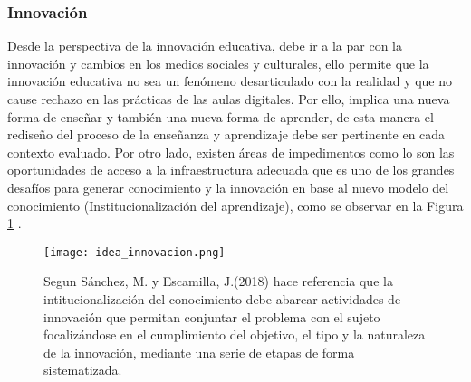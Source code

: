 \documentclass{article}
\begin{document}
\subsubsection{Innovación}
Desde la perspectiva de la innovación educativa, debe ir a la par con la innovación y cambios en los medios sociales y culturales, ello permite que la innovación educativa no sea un fenómeno desarticulado con la realidad y que no cause rechazo en las prácticas de las aulas digitales. Por ello, implica una nueva forma de enseñar y también una nueva forma de aprender, de esta manera el rediseño del proceso de la enseñanza y aprendizaje debe ser pertinente en cada contexto evaluado. Por otro lado, existen áreas de impedimentos como lo son las oportunidades de acceso a la infraestructura adecuada que es uno de los grandes desafíos para generar conocimiento y la innovación en base al nuevo modelo del conocimiento (Institucionalización del aprendizaje), como se observar en la Figura \ref{fig:innovación} \citep{imagia}.

\begin{figure}[ht]
    \centering
    \texttt{[image: idea\_innovacion.png]}
    \caption{Segun Sánchez, M. y Escamilla, J.(2018) hace referencia que la intitucionalización del conocimiento debe abarcar actividades de innovación que permitan conjuntar el problema con el sujeto focalizándose en el cumplimiento del objetivo, el tipo y la naturaleza de la innovación, mediante una serie de etapas de forma sistematizada. }
    \label{fig:innovación}
\end{figure}
\end{document}
